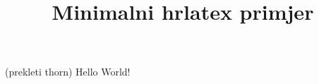 \documentclass{minimal}
\title{Minimalni hrlatex primjer}
\begin{document}
\th (prekleti thorn)
Hello World!
\end{document}
